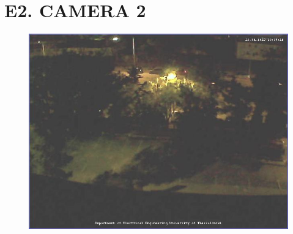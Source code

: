 \documentclass{article}
\begin{document}
\section*{E2. CAMERA 2}

\begin{figure}[h!]
 \begin{center}
 \advance\leftskip-4cm
  \includegraphics[width=200mm,scale=0.7]{cam2s1.jpeg}
   
  
\end{center}
\end{figure}
\end{document}
